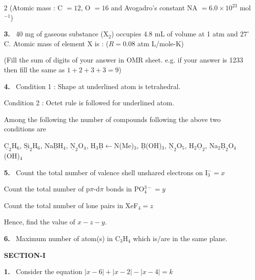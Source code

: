 \documentclass[10pt]{extarticle}
\newcommand{\partsec}[2]{\par\medskip\noindent{\large\bfseries PART-#1: #2}\par\smallskip}
\newcommand{\sect}[1]{\par\smallskip\noindent\textbf{#1}\par}
\newcommand{\qn}[1]{\par\smallskip\noindent\textbf{#1.}~}
\begin{document}
\begin{multicols}{2}
(Atomic mass : C $=12$, O $=16$ and Avogadro's constant NA $=6.0\times10^{23}$ mol$^{-1}$)
\qn{3} 40 mg of gaseous substance (X$_2$) occupies 4.8 mL of volume at 1 atm and $27^\circ$C. Atomic mass of element X is : ($R=0.08$ atm L/mole-K)

(Fill the sum of digits of your answer in OMR sheet. e.g. if your answer is 1233 then fill the same as $1+2+3+3=9$)
\qn{4} Condition 1 : Shape at underlined atom is tetrahedral.

Condition 2 : Octet rule is followed for underlined atom.

Among the following the number of compounds following the above two conditions are

$\underline{\mathrm C}_2$H$_6$, $\underline{\mathrm{Si}}_2$H$_6$, Na$\underline{\mathrm B}$H$_4$, $\underline{\mathrm N}_2$O$_4$, H$_3\underline{\mathrm B}\leftarrow$N(Me)$_3$, $\underline{\mathrm B}$(OH)$_3$, $\underline{\mathrm N}_2$O$_5$, H$_2\underline{\mathrm O}_2$, Na$_2\underline{\mathrm B}_2$O$_4$(OH)$_4$
\qn{5} Count the total number of valence shell unshared electrons on I$_3^-=x$

Count the total number of p$\pi$-d$\pi$ bonds in PO$_4^{3-}=y$

Count the total number of lone pairs in XeF$_4=z$

Hence, find the value of $x-z-y$.
\qn{6} Maximum number of atom(s) in C$_3$H$_4$ which is/are in the same plane.
\columnbreak
\partsec{3}{MATHEMATICS}
\sect{SECTION-I}
\qn{1} Consider the equation $|x-6|+|x-2|-|x-4|=k$


\end{multicols}
\end{document}
